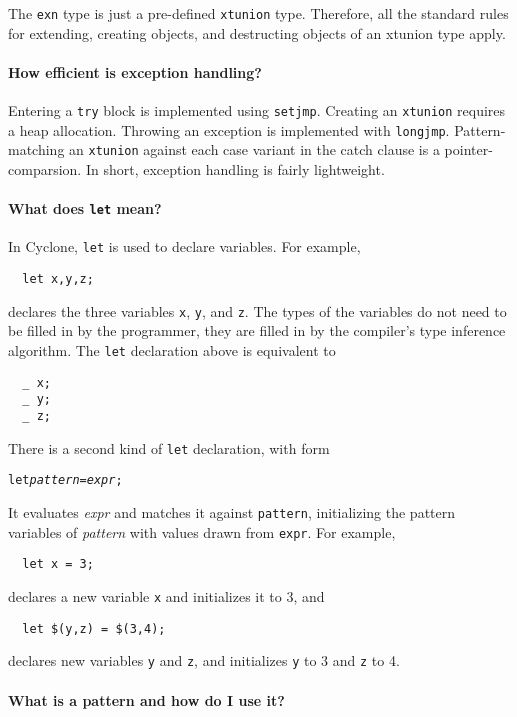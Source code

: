 The \texttt{exn} type is just a pre-defined \texttt{xtunion} type.
Therefore, all the standard rules for extending, creating objects, and
destructing objects of an xtunion type apply.

\paragraph{How efficient is exception handling?}

Entering a \texttt{try} block is implemented using \texttt{setjmp}.
Creating an \texttt{xtunion} requires a heap allocation.  Throwing an
exception is implemented with \texttt{longjmp}.  Pattern-matching an
\texttt{xtunion} against each case variant in the catch clause is a
pointer-comparsion.  In short, exception handling is fairly
lightweight.

\paragraph{What does \texttt{let} mean?}

In Cyclone, \texttt{let} is used to declare variables.  For example,
\begin{verbatim}
  let x,y,z;
\end{verbatim}
declares the three variables \texttt{x}, \texttt{y}, and \texttt{z}.
The types of the variables do not need to be filled in by the
programmer, they are filled in by the compiler's type inference
algorithm.  The \texttt{let} declaration above is equivalent to
\begin{verbatim}
  _ x;
  _ y;
  _ z;
\end{verbatim}

There is a second kind of \texttt{let} declaration, with form
\begin{alltt}
  let {\it pattern} = {\it expr};
\end{alltt}
It evaluates \textit{expr} and matches it against \texttt{pattern},
initializing the pattern variables of \textit{pattern} with values
drawn from \texttt{expr}.  For example,
\begin{verbatim}
  let x = 3;
\end{verbatim}
declares a new variable \texttt{x} and initializes it to 3, and
\begin{verbatim}
  let $(y,z) = $(3,4);
\end{verbatim}
declares new variables \texttt{y} and \texttt{z}, and initializes
\texttt{y} to 3 and \texttt{z} to 4.

\paragraph{What is a pattern and how do I use it?}

